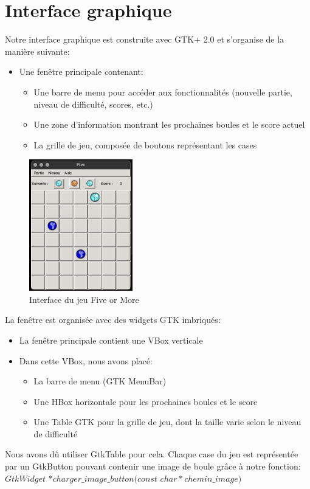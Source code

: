 \section{Interface graphique}\label{interface}

Notre interface graphique est construite avec GTK+ 2.0 et s'organise de 
la manière suivante:

\begin{itemize}
    \item Une fenêtre principale contenant:
    \begin{itemize}
        \item Une barre de menu pour accéder aux fonctionnalités 
        (nouvelle partie, niveau de difficulté, scores, etc.)
        \item Une zone d'information montrant les prochaines boules et le score actuel
        \item La grille de jeu, composée de boutons représentant les cases
    \end{itemize}
\end{itemize}

\begin{figure}[H]
    \centering
    \includegraphics[width=0.4\textwidth]{interface.jpeg}
    \caption{Interface du jeu Five or More}
    \label{fig:Interface}
\end{figure}

La fenêtre est organisée avec des widgets GTK imbriqués:
\begin{itemize}
    \item La fenêtre principale contient une VBox verticale
    \item Dans cette VBox, nous avons placé:
    \begin{itemize}
        \item La barre de menu (GTK MenuBar)
        \item Une HBox horizontale pour les prochaines boules et le score
        \item Une Table GTK pour la grille de jeu, dont la taille varie selon 
        le niveau de difficulté
    \end{itemize}
\end{itemize}

Nous avons dû utiliser GtkTable pour cela. 
Chaque case du jeu est représentée par un GtkButton pouvant contenir une image 
de boule grâce à notre fonction: \\
$GtkWidget ${ }$ *charger\_image\_button(const ${ }$ char { } *chemin\_image)$
